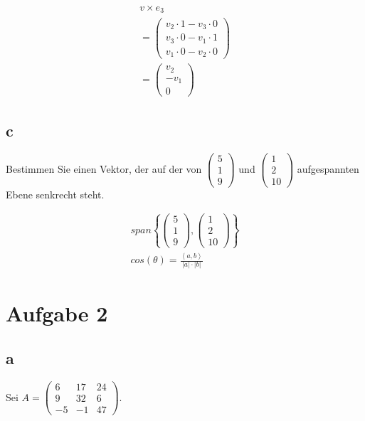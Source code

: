 \begin{align*}
    v \times e_3 \\
    = \begin{pmatrix}
        v_2 \cdot 1 - v_3 \cdot 0 \\
        v_3 \cdot 0 - v_1 \cdot 1 \\
        v_1 \cdot 0 - v_2 \cdot 0
    \end{pmatrix} \\
    = \begin{pmatrix}
        v_2 \\ -v_1 \\ 0
    \end{pmatrix}
\end{align*}

\subsection{c}
Bestimmen Sie einen Vektor, der auf der von $\begin{pmatrix}5 \\ 1 \\ 9\end{pmatrix}$ und $\begin{pmatrix}1 \\ 2 \\ 10\end{pmatrix}$ aufgespannten Ebene senkrecht steht.

\begin{align*}
    span\left\{\begin{pmatrix}
        5 \\ 1 \\ 9
    \end{pmatrix}, \begin{pmatrix}
        1 \\ 2 \\ 10
    \end{pmatrix}\right\} \\
    cos(\theta) = \frac{\left\langle a, b\right\rangle}{\left|a\right| \cdot \left|b\right|}
\end{align*}

\section{Aufgabe 2}

\subsection{a}
Sei $A = \begin{pmatrix}6 & 17 & 24 \\ 9 & 32 & 6 \\ -5 & -1 & 47\end{pmatrix}$.

